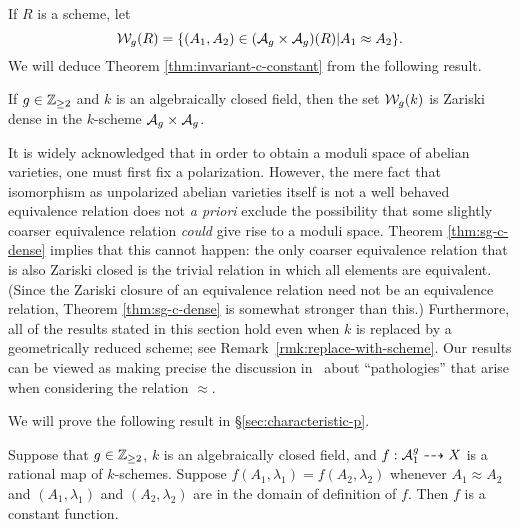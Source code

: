 \documentclass{amsart}
\begin{document}
If $R$ is a scheme, let
$$
\mathcal{W}_g(R) = \{(A_1,A_2) \in (\mathcal{A}_g \times \mathcal{A}_g)(R) | A_1 \approx A_2\}.
$$
We will deduce Theorem \ref{thm:invariant-c-constant} from the following result.

\begin{theorem}\label{thm:sg-c-dense}
  If $g\in\mathbb{Z}_{\ge 2}$ and $k$ is an algebraically closed field, then the set $\mathcal{W}_g(k)$ is Zariski dense in the $k$-scheme $\mathcal{A}_g \times \mathcal{A}_g$.
\end{theorem}

It is widely acknowledged that in order to obtain a moduli space of abelian varieties, one must first fix a polarization.  However, the mere fact that isomorphism as unpolarized abelian varieties itself is not a well behaved equivalence relation does not {\it a priori} exclude the possibility that some slightly coarser equivalence relation {\em could} give rise to a moduli space. Theorem \ref{thm:sg-c-dense} implies that this cannot happen: the only coarser equivalence relation that is also Zariski closed is the trivial relation in which all elements are equivalent.
(Since the Zariski closure of an equivalence relation need not be an equivalence relation, Theorem \ref{thm:sg-c-dense} is somewhat stronger than this.) Furthermore, all of the results stated in this section hold even when $k$ is replaced by a geometrically reduced scheme; see Remark~\ref{rmk:replace-with-scheme}.
Our results can be viewed as making precise the discussion in~\cite[p. 97]{git} about  ``pathologies'' that arise when considering the relation $\approx$.

We will prove the following result in \S\ref{sec:characteristic-p}.
\begin{theorem}\label{thm:arbit-char}
  Suppose that $g\in\mathbb{Z}_{\ge 2}$, $k$ is an algebraically closed field, and $f: \mathcal{A}_1^g \dashrightarrow X$ is a rational map of $k$-schemes. Suppose $f(A_1,\lambda_1) = f(A_2,\lambda_2)$ whenever $A_1 \approx A_2$ and $(A_1,\lambda_1)$ and $(A_2,\lambda_2)$ are in the domain of definition of $f$. Then $f$ is a constant function.
\end{theorem}

\end{document}
